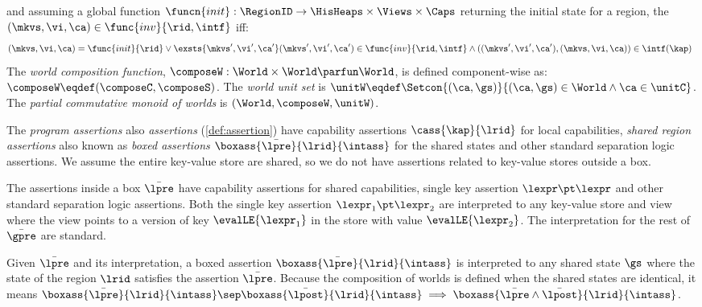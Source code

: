 \begin{definition}[Worlds]
\[\] 
and assuming a global function \( \funcn{init} : \RegionID \to \HisHeaps \times \Views \times \Caps \) returning the initial state for a region,
the \( ( \mkvs, \vi, \ca ) \in \func{inv}{\rid, \intf} \) iff:
\[
\begin{array}[t]{@{}l}
    ( \mkvs, \vi, \ca ) = \func{init}{\rid} 
    \lor \exsts{\mkvs', \vi', \ca'}
    ( \mkvs' , \vi', \ca' ) \in \func{inv}{\rid, \intf} \land (( \mkvs' , \vi', \ca' ), ( \mkvs, \vi, \ca )) \in \intf(\kap) 
\end{array}
\]
% 
The \emph{world composition function}, $\composeW: \World \times \World \parfun \World$, is defined component-wise as: $\composeW \eqdef (\composeC, \composeS)$.
The \emph{world unit set} is $\unitW \eqdef \Setcon{(\ca, \gs)}{(\ca, \gs) \in \World \land \ca \in \unitC}$.
The \emph{partial commutative monoid of worlds} is $(\World, \composeW, \unitW)$.
\end{definition}

The \emph{program assertions} also \emph{assertions} (\cref{def:assertion}) have capability assertions \( \cass{\kap}{\lrid} \) for local capabilities, \emph{shared region assertions} also known as \emph{boxed assertions} \( \boxass{\bar{\lpre}}{\lrid}{\intass} \) for the shared states and other standard separation logic assertions.
We assume the entire key-value store are shared, so we do not have assertions related to key-value stores outside a box.

The assertions inside a box \( \bar{\lpre} \) have capability assertions for shared capabilities, single key assertion \( \lexpr \pt \lexpr \) and other standard separation logic assertions.
Both the single key assertion \( \lexpr_1 \pt \lexpr_2 \) are interpreted to any key-value store and view where the view points to a version of key \( \evalLE{\lexpr_1 }\) in the store with value \( \evalLE{\lexpr_2}\).
The interpretation for the rest of \( \bar{\gpre} \) are standard.

Given \( \bar{\lpre} \) and its interpretation, a boxed assertion \( \boxass{\bar{\lpre}}{\lrid}{\intass} \) is interpreted to any shared state \( \gs \) where the state of the region \( \lrid \) satisfies the assertion \( \bar{\lpre} \).
Because the composition of worlds is defined when the shared states are identical, it means \( \boxass{\bar{\lpre}}{\lrid}{\intass} \sep \boxass{\bar{\lpost}}{\lrid}{\intass} \implies \boxass{\bar{\lpre} \land \bar{\lpost} }{\lrid}{\intass} \).


